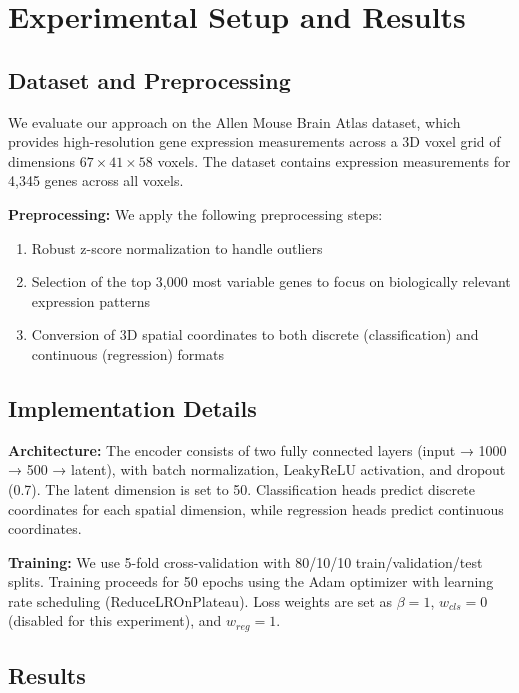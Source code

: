 \documentclass[11pt]{article}
\begin{document}
\section{Experimental Setup and Results}
\label{sec:experiments}

\subsection{Dataset and Preprocessing}

We evaluate our approach on the Allen Mouse Brain Atlas dataset, which provides high-resolution gene expression measurements across a 3D voxel grid of dimensions $67 \times 41 \times 58$ voxels. The dataset contains expression measurements for 4,345 genes across all voxels.

\textbf{Preprocessing:} We apply the following preprocessing steps:
\begin{enumerate}
\item Robust z-score normalization to handle outliers
\item Selection of the top 3,000 most variable genes to focus on biologically relevant expression patterns
\item Conversion of 3D spatial coordinates to both discrete (classification) and continuous (regression) formats
\end{enumerate}

\subsection{Implementation Details}

\textbf{Architecture:} The encoder consists of two fully connected layers (input → 1000 → 500 → latent), with batch normalization, LeakyReLU activation, and dropout (0.7). The latent dimension is set to 50. Classification heads predict discrete coordinates for each spatial dimension, while regression heads predict continuous coordinates.

\textbf{Training:} We use 5-fold cross-validation with 80/10/10 train/validation/test splits. Training proceeds for 50 epochs using the Adam optimizer with learning rate scheduling (ReduceLROnPlateau). Loss weights are set as $\beta = 1$, $w_{cls} = 0$ (disabled for this experiment), and $w_{reg} = 1$.

\subsection{Results}
\end{document}
